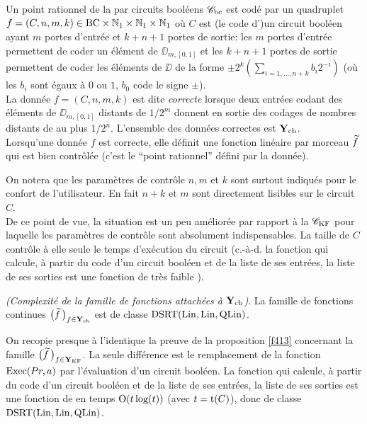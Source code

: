 \begin{fdefinition} \label{f418}
Un point rationnel de la \pres par circuits booléens  ${{{\mathscr C}}_{\rm bc}}$  est codé par 
un quadruplet  $f = (C, n, m, k) \in {\rm BC} \times \mathbb {N}_1 \times \mathbb {N}_1 \times 
\mathbb {N}_1$  où  $C$   est (le code d')un circuit booléen ayant  $m$  portes 
d'entrée et  $k+n+1$   portes de sortie:  les $m$   portes d'entrée 
permettent de coder un élément de $\DD_{m,[0,1]}$  et  les $k+n+1$  portes 
de sortie permettent de coder les éléments de  $\DD$  de la forme 
$\pm 2^k\left( \sum_{i=1,\ldots,n+k}b_i2^{-i}\right)$  (où les $b_i$ sont 
égaux à $0$ ou $1$, $b_0$ code le signe $\pm$).\\
La donnée  $f = (C, n, m, k)$  est dite {\em correcte} lorsque deux entrées 
codant des éléments de  $\DD_{m,[0,1]}$  distants de  $1/2^m$  donnent en 
sortie des codages de nombres distants de au plus  $1/2^n$.  L'ensemble des 
données correctes est  ${{\bf Y}_{\rm cb}}$.\\
Lorsqu'une donnée $f$ est correcte, elle définit une fonction linéaire par 
morceau  $\widetilde{f}$   qui est bien contrôlée (c'est le ``point 
rationnel'' défini par la donnée).
\end{fdefinition}

On notera que les paramètres de contrôle  $n, m$ et $k$  sont surtout 
indiqués pour le confort de l'utilisateur. En fait  $n+k$   et  $m$  sont 
directement lisibles sur le circuit  $C$. \\
De ce point de vue, la situation est un peu améliorée par rapport à la 
\pres  ${{{\mathscr C}}_{\rm KF}}$  pour laquelle les paramètres de contrôle sont absolument 
indispensables.
La taille de  $C$  contrôle à elle seule le temps d'exécution du circuit  
(c.-à-d. la fonction qui calcule, à partir du code d'un circuit booléen et 
de la liste de ses entrées, la liste de ses sorties est une fonction de très 
faible \comz).
\begin{fproposition} \label{f419} 
{\em  (Complexité de la famille de fonctions attachées à   ${{\bf Y}_{\rm cb}}$)}.  
La famille de fonctions continues  $\big(\widetilde{f}\,\big)_{f \in {{\bf Y}_{\rm cb}} }$ est \uni de 
classe  ${\rm DSRT}({\rm Lin}, {\rm Lin}, {\rm QLin})$.
\end{fproposition}

\proof
On recopie presque à l'identique la preuve de la proposition \ref{f413} 
concernant la famille  $\big(\widetilde{f}\,\big)_{f \in {{\bf Y}_{\rm KF}}}$. La seule différence est 
le remplacement de la fonction  ${\rm Exec}(Pr,a)$  par l'évaluation d'un circuit 
booléen.   La fonction qui calcule, à partir du code d'un circuit booléen 
et de la liste de ses entrées, la liste de ses sorties est une fonction de 
\com en temps ${\rm O}(t\log(t))$ (avec $t = {\rm t}(C)$), donc de classe  ${\rm DSRT}({\rm Lin}, 
{\rm Lin}, {\rm QLin})$. 	\eop

